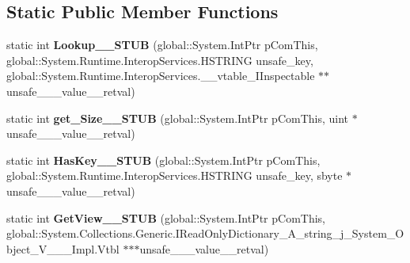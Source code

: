 \subsection*{Static Public Member Functions}
\begin{DoxyCompactItemize}
\item 
\mbox{\label{struct_system_1_1_collections_1_1_generic_1_1_i_dictionary___a__string__j___system___object___v_______impl_1_1_vtbl_addd04e4577cc143b895c5a3f5d104d3e}} 
static int {\bfseries Lookup\+\_\+\+\_\+\+S\+T\+UB} (global\+::\+System.\+Int\+Ptr p\+Com\+This, global\+::\+System.\+Runtime.\+Interop\+Services.\+H\+S\+T\+R\+I\+NG unsafe\+\_\+key, global\+::\+System.\+Runtime.\+Interop\+Services.\+\_\+\+\_\+vtable\+\_\+\+I\+Inspectable $\ast$$\ast$unsafe\+\_\+\+\_\+\+\_\+value\+\_\+\+\_\+retval)
\item 
\mbox{\label{struct_system_1_1_collections_1_1_generic_1_1_i_dictionary___a__string__j___system___object___v_______impl_1_1_vtbl_af4a5a903b46cb9fecb131bac2ccdf8d4}} 
static int {\bfseries get\+\_\+\+Size\+\_\+\+\_\+\+S\+T\+UB} (global\+::\+System.\+Int\+Ptr p\+Com\+This, uint $\ast$unsafe\+\_\+\+\_\+\+\_\+value\+\_\+\+\_\+retval)
\item 
\mbox{\label{struct_system_1_1_collections_1_1_generic_1_1_i_dictionary___a__string__j___system___object___v_______impl_1_1_vtbl_a972ac0c13db7e6d564603288e0e2433d}} 
static int {\bfseries Has\+Key\+\_\+\+\_\+\+S\+T\+UB} (global\+::\+System.\+Int\+Ptr p\+Com\+This, global\+::\+System.\+Runtime.\+Interop\+Services.\+H\+S\+T\+R\+I\+NG unsafe\+\_\+key, sbyte $\ast$unsafe\+\_\+\+\_\+\+\_\+value\+\_\+\+\_\+retval)
\item 
\mbox{\label{struct_system_1_1_collections_1_1_generic_1_1_i_dictionary___a__string__j___system___object___v_______impl_1_1_vtbl_a9882de5701b0ac3eaecba10f136a31ef}} 
static int {\bfseries Get\+View\+\_\+\+\_\+\+S\+T\+UB} (global\+::\+System.\+Int\+Ptr p\+Com\+This, global\+::\+System.\+Collections.\+Generic.\+I\+Read\+Only\+Dictionary\+\_\+\+A\+\_\+string\+\_\+j\+\_\+\+System\+\_\+\+Object\+\_\+\+V\+\_\+\+\_\+\+\_\+\+Impl.\+Vtbl $\ast$$\ast$$\ast$unsafe\+\_\+\+\_\+\+\_\+value\+\_\+\+\_\+retval)
$$
\end{DoxyCompactItemize}

